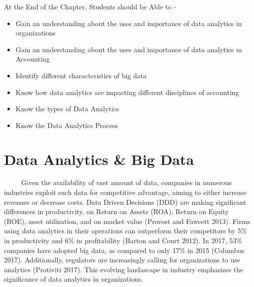 \documentclass[
  letterpaper,
  DIV=11,
  numbers=noendperiod]{scrreprt}
\begin{document}
\begin{tcolorbox}[enhanced jigsaw, arc=.35mm, bottomrule=.15mm, bottomtitle=1mm, breakable, colback=white, colbacktitle=quarto-callout-note-color!10!white, colframe=quarto-callout-note-color-frame, coltitle=black, left=2mm, leftrule=.75mm, opacityback=0, opacitybacktitle=0.6, rightrule=.15mm, title=\textcolor{quarto-callout-note-color}{\faInfo}\hspace{0.5em}{Learning Objectives}, titlerule=0mm, toprule=.15mm, toptitle=1mm]

At the End of the Chapter, Students should be Able to -

\begin{itemize}
\item
  Gain an understanding about the uses and importance of data analytics
  in organizations
\item
  Gain an understanding about the uses and importance of data analytics
  in Accounting
\item
  Identify different characteristics of big data
\item
  Know how data analytics are impacting different disciplines of
  accounting
\item
  Know the types of Data Analytics
\item
  Know the Data Analytics Process
\end{itemize}

\end{tcolorbox}

\section{Data Analytics \& Big Data}\label{data-analytics-big-data}

~~~~~Given the availability of vast amount of data, companies in
numerous industries exploit such data for competitive advantage, aiming
to either increase revenues or decrease costs. Data Driven Decisions
(DDD) are making significant differences in productivity, on Return on
Assets (ROA), Return on Equity (ROE), asset utilization, and on market
value (Provost and Fawcett 2013). Firms using data analytics in their
operations can outperform their competitors by 5\% in productivity and
6\% in profitability (Barton and Court 2012). In 2017, 53\% companies
have adopted big data, as compared to only 17\% in 2015 (Columbus 2017).
Additionally, regulators are increasingly calling for organizations to
use analytics (Protiviti 2017). This evolving landascape in industry
emphasizes the significance of data analytics in organizations.
\end{document}
